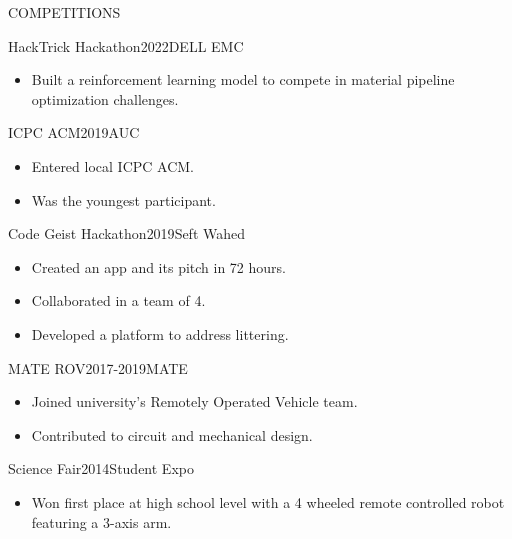 \documentclass{resume}
\begin{document}
\begin{minipage}[t]{0.49\textwidth}

	\begin{rsection}{\MakeUppercase{competitions}}{}

		\begin{rcontent}{HackTrick Hackathon}{2022}{DELL EMC}
			\begin{itemize}
				\item Built a reinforcement learning model to compete in material pipeline optimization challenges.
			\end{itemize}
		\end{rcontent}
		\divider
		\begin{rcontent}{ICPC ACM}{2019}{AUC}
			\begin{itemize}
				\item Entered local ICPC ACM.
				\item Was the youngest participant.
			\end{itemize}
		\end{rcontent}
		\divider
		\begin{rcontent}{Code Geist Hackathon}{2019}{Seft Wahed}
			\begin{itemize}
				\item Created an app and its pitch in 72 hours.
				\item Collaborated in a team of 4.
				\item Developed a platform to address littering.
			\end{itemize}
		\end{rcontent}
		\divider
		\begin{rcontent}{MATE ROV}{2017-2019}{MATE}
			\begin{itemize}
				\item Joined university's Remotely Operated Vehicle team.
				\item Contributed to circuit and mechanical design.
			\end{itemize}
		\end{rcontent}
		\divider
		\begin{rcontent}{Science Fair}{2014}{Student Expo}
			\begin{itemize}
				\item Won first place at high school level with a 4 wheeled remote controlled robot featuring a 3-axis arm.
			\end{itemize}
		\end{rcontent}
	\end{rsection}


\end{minipage}
\end{document}
